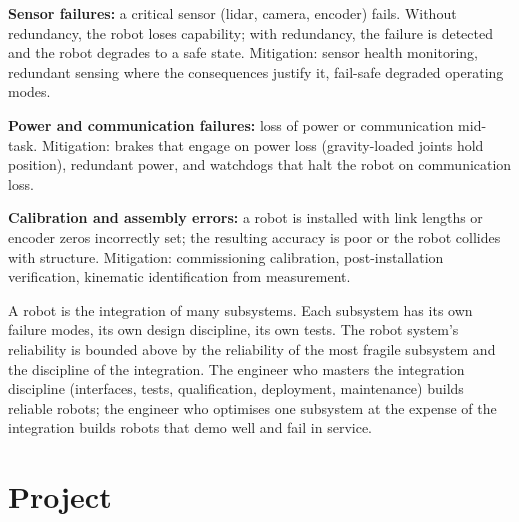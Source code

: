 \textbf{Sensor failures:} a critical sensor (lidar, camera, encoder) fails. Without redundancy, the robot loses capability; with redundancy, the failure is detected and the robot degrades to a safe state. Mitigation: sensor health monitoring, redundant sensing where the consequences justify it, fail-safe degraded operating modes.

\textbf{Power and communication failures:} loss of power or communication mid-task. Mitigation: brakes that engage on power loss (gravity-loaded joints hold position), redundant power, and watchdogs that halt the robot on communication loss.

\textbf{Calibration and assembly errors:} a robot is installed with link lengths or encoder zeros incorrectly set; the resulting accuracy is poor or the robot collides with structure. Mitigation: commissioning calibration, post-installation verification, kinematic identification from measurement.

\begin{principle}
A robot is the integration of many subsystems. Each subsystem has its own failure modes, its own design discipline, its own tests. The robot system's reliability is bounded above by the reliability of the most fragile subsystem and the discipline of the integration. The engineer who masters the integration discipline (interfaces, tests, qualification, deployment, maintenance) builds reliable robots; the engineer who optimises one subsystem at the expense of the integration builds robots that demo well and fail in service.
\end{principle}

\section{Project}

